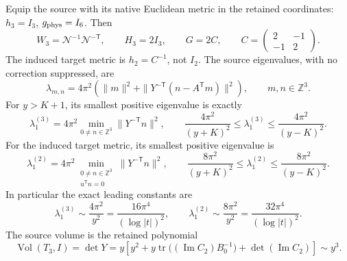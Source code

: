 \begin{proposition}
\label{q444:native-period-spectrum}
Equip the source with its native Euclidean metric in the retained
coordinates: $h_3=I_3$, $g_{\rm phys}=I_6$. Then
\[
 W_3=\mathcal N^{-1}\mathcal N^{-\mathsf T},\qquad
 H_3=2I_3,\qquad G=2C,\qquad
 C=\begin{pmatrix}2&-1\\-1&2\end{pmatrix}.                     \tag{HS.18}
\]
The induced target metric is $h_2=C^{-1}$, not $I_2$.
The source eigenvalues, with no correction suppressed, are
\[
 \lambda_{m,n}
 =4\pi^2\left(\|m\|^2+
       \|Y^{-\mathsf T}(n-A^{\mathsf T}m)\|^2\right),
       \qquad m,n\in\mathbb Z^3.                            \tag{HS.19}
\]
For $y>K+1$, its smallest positive eigenvalue is exactly
\[
 \lambda_1^{(3)}
 =4\pi^2\min_{0\ne n\in\mathbb Z^3}\|Y^{-\mathsf T}n\|^2,
 \qquad
 \frac{4\pi^2}{(y+K)^2}\leq\lambda_1^{(3)}
                  \leq\frac{4\pi^2}{(y-K)^2}.                \tag{HS.20}
\]
For the induced target metric, its smallest positive eigenvalue is
\[
 \lambda_1^{(2)}
 =4\pi^2\min_{\substack{0\ne n\in\mathbb Z^3\\u^{\mathsf T}n=0}}
                \|Y^{-\mathsf T}n\|^2,\qquad
 \frac{8\pi^2}{(y+K)^2}\leq\lambda_1^{(2)}
                  \leq\frac{8\pi^2}{(y-K)^2}.                \tag{HS.21}
\]
In particular the exact leading constants are
\[
 \lambda_1^{(3)}\sim\frac{4\pi^2}{y^2}
   =\frac{16\pi^4}{(\log|t|)^2},\qquad
 \lambda_1^{(2)}\sim\frac{8\pi^2}{y^2}
   =\frac{32\pi^4}{(\log|t|)^2}.                              \tag{HS.22}
\]
The source volume is the retained polynomial
\[
 \operatorname{Vol}(T_3,I)
 =\det Y
 =y\left[y^2+
 y\operatorname{tr}\bigl((\operatorname{Im}C_2)B_0^{-1}\bigr)
 +\det(\operatorname{Im}C_2)\right]\sim y^3.                  \tag{HS.23}
\]
\end{proposition}

